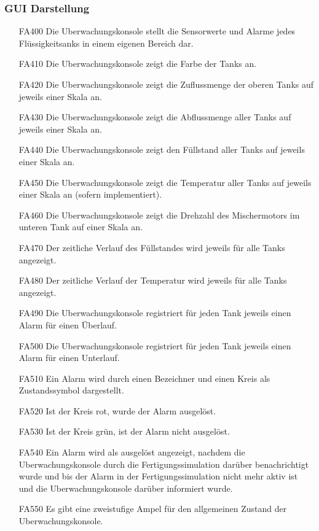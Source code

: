 \documentclass[parskip=full]{scrartcl}
\begin{document}
\subsubsection{GUI Darstellung}
\begin{enumerate}
\item[FA400] Die \gls{Uberwachungskonsole} stellt die Sensorwerte und Alarme jedes Flüssigkeitsanks in einem eigenen Bereich dar.
\item[FA410] Die \gls{Uberwachungskonsole} zeigt die Farbe der Tanks an.
\item[FA420] Die \gls{Uberwachungskonsole} zeigt die Zuflussmenge der oberen Tanks auf jeweils einer Skala an.
\item[FA430] Die \gls{Uberwachungskonsole} zeigt die Abflussmenge aller Tanks auf jeweils einer Skala an.
\item[FA440] Die \gls{Uberwachungskonsole} zeigt den Füllstand aller Tanks auf jeweils einer Skala an.
\item[FA450] Die \gls{Uberwachungskonsole} zeigt die Temperatur aller Tanks auf jeweils einer Skala an (sofern implementiert).
\item[FA460] Die \gls{Uberwachungskonsole} zeigt die Drehzahl des Mischermotors im unteren Tank auf einer Skala an.
\item[FA470] Der zeitliche Verlauf des Füllstandes wird jeweils für alle Tanks angezeigt.
\item[FA480] Der zeitliche Verlauf der Temperatur wird jeweils für alle Tanks angezeigt.
\item[FA490] Die \gls{Uberwachungskonsole} registriert für jeden Tank jeweils einen Alarm für einen Überlauf.
\item[FA500] Die \gls{Uberwachungskonsole} registriert für jeden Tank jeweils einen Alarm für einen Unterlauf.
\item[FA510] Ein Alarm wird durch einen Bezeichner und einen Kreis als Zustandssymbol dargestellt.
\item[FA520] Ist der Kreis rot, wurde der Alarm ausgelöst.
\item[FA530] Ist der Kreis grün, ist der Alarm nicht ausgelöst.
\item[FA540] Ein Alarm wird als ausgelöst angezeigt, nachdem die \gls{Uberwachungskonsole} durch die \gls{Fertigungssimulation} darüber benachrichtigt wurde und bis der Alarm in der \gls{Fertigungssimulation} nicht mehr aktiv ist und die \gls{Uberwachungskonsole} darüber informiert wurde.
\item[FA550] Es gibt eine zweistufige Ampel für den allgemeinen Zustand der \gls{Uberwachungskonsole}.

\end{enumerate}
\end{document}
